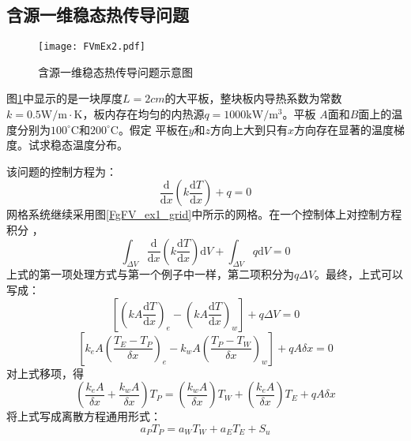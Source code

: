 \subsection{含源一维稳态热传导问题}
\begin{figure}[H]
  \centering
  \texttt{[image: FVmEx2.pdf]}
  \caption{含源一维稳态热传导问题示意图}
  \label{FgFV_ex2}
\end{figure}
图\ref{FgFV_ex2}中显示的是一块厚度$L=2cm$的大平板，整块板内导热系数为常数
$k=0.5\mathrm{W/m\cdot K}$，板内存在均匀的内热源$q=1000\mathrm{kW/m^{3}}$。平板
$A$面和$B$面上的温度分别为$100^{\circ}\mathrm{C}$和$200^{\circ}\mathrm{C}$。假定
平板在$y$和$z$方向上大到只有$x$方向存在显著的温度梯度。试求稳态温度分布。

该问题的控制方程为：
\begin{equation}
\frac{\mathrm{d} }{\mathrm{d} x}
\left(
  k
  \frac{\mathrm{d} T}{\mathrm{d} x}
\right)
+
q
=
0
\end{equation}
网格系统继续采用图\ref{FgFV_ex1_grid}中所示的网格。在一个控制体上对控制方程积分
，
\begin{equation}
  \int_{\Delta V}\!
\frac{\mathrm{d} }{\mathrm{d} x}
\left(
  k
  \frac{\mathrm{d} T}{\mathrm{d} x}
\right)
\mathrm{d}V
+
  \int_{\Delta V}\!
  q
\mathrm{d}V
=
0
\end{equation}
上式的第一项处理方式与第一个例子中一样，第二项积分为$q\Delta V$。最终，上式可以
写成：
\begin{equation}
  \left[
    \left(
      kA\frac{\mathrm{d} T}{\mathrm{d} x}
    \right)_{e}
    -
    \left(
      kA\frac{\mathrm{d} T}{\mathrm{d} x}
    \right)_{w}
  \right]
  +
  q\Delta V
  =
  0
\end{equation}
\begin{equation}
  \left[
    k_{e}A
    \left(
      \frac{T_{E}-T_{P}}{\delta x}
    \right)_{e}
    -
    k_{w}A
    \left(
      \frac{T_{P}-T_{W}}{\delta x}
    \right)_{w}
  \right]
  +
  qA\delta x
  =
  0
\end{equation}
对上式移项，得
\begin{equation}
  \left(
    \frac{k_{e}A}{\delta x}
    +
    \frac{k_{w}A}{\delta x}
  \right)
  T_{P}
  =
  \left(
    \frac{k_{w}A}{\delta x}
  \right)
  T_{W}
  +
  \left(
    \frac{k_{e}A}{\delta x}
  \right)
  T_{E}
  +
  qA\delta x
\end{equation}
将上式写成离散方程通用形式：
\begin{equation}
  a_{P}T_{P} = a_{W}T_{W}+a_{E}T_{E}+S_{u}
  \label{EqFV_ex2_coeff}
\end{equation}

